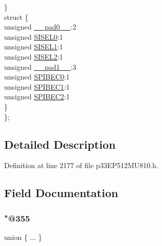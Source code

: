 \begin{DoxyCompactItemize}
\begin{tabbing}
\>\} \\
\>struct \{\\
\>\>unsigned \hyperlink{structtag_s_p_i3_s_t_a_t_b_i_t_s_adf71f3d8410c1f1dbbc96680a92c49af}{\_\_pad0\_\_}:2\\
\>\>unsigned \hyperlink{structtag_s_p_i3_s_t_a_t_b_i_t_s_a718402bd0465fbc4fd6a2a312afc68cc}{SISEL0}:1\\
\>\>unsigned \hyperlink{structtag_s_p_i3_s_t_a_t_b_i_t_s_a70b3f81521b4df5d2bdc98a48ab8a777}{SISEL1}:1\\
\>\>unsigned \hyperlink{structtag_s_p_i3_s_t_a_t_b_i_t_s_a9a7815799509b1ff427025989182aa2a}{SISEL2}:1\\
\>\>unsigned \hyperlink{structtag_s_p_i3_s_t_a_t_b_i_t_s_acaf2d0924a107ec6e8d2e31febaf66f9}{\_\_pad1\_\_}:3\\
\>\>unsigned \hyperlink{structtag_s_p_i3_s_t_a_t_b_i_t_s_aa9b4c159cfcb7a8c3eaf3369b146b3a2}{SPIBEC0}:1\\
\>\>unsigned \hyperlink{structtag_s_p_i3_s_t_a_t_b_i_t_s_ae1c44e4e7fb1aec2d5856ba13ed7851b}{SPIBEC1}:1\\
\>\>unsigned \hyperlink{structtag_s_p_i3_s_t_a_t_b_i_t_s_a995b2cfafb90409d16825fc4d4b23a35}{SPIBEC2}:1\\
\>\} \\
\}; \\

\end{tabbing}\end{DoxyCompactItemize}


\subsection{Detailed Description}


Definition at line 2177 of file p33\+E\+P512\+M\+U810.\+h.



\subsection{Field Documentation}
\mbox{\label{structtag_s_p_i3_s_t_a_t_b_i_t_s_a3f72c28a2148099c484afabaf3c04003}} 
\subsubsection{\texorpdfstring{"@355}{@355}}
{\footnotesize\ttfamily union \{ ... \} }

\mbox{\label{structtag_s_p_i3_s_t_a_t_b_i_t_s_adf71f3d8410c1f1dbbc96680a92c49af}} 
